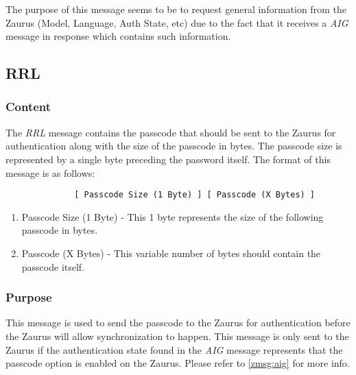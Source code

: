             The purpose of this message seems to be to request general
            information from the Zaurus (Model, Language, Auth State, etc) due
            to the fact that it receives a \emph{AIG} message in response
            which contains such information.

        \subsection{RRL}

            \subsubsection{Content}

            The \emph{RRL} message contains the passcode that should be sent
            to the Zaurus for authentication along with the size of the
            passcode in bytes. The passcode size is represented by a single
            byte preceding the password itself. The format of this message is
            as follows:

            \begin{verbatim}
              [ Passcode Size (1 Byte) ] [ Passcode (X Bytes) ]
            \end{verbatim}

            \begin{enumerate}
            \item Passcode Size (1 Byte) - This 1 byte represents the size of
              the following passcode in bytes.

            \item Passcode (X Bytes) - This variable number of bytes should
              contain the passcode itself.
            \end{enumerate}
            
            \subsubsection{Purpose}

            This message is used to send the passcode to the Zaurus for
            authentication before the Zaurus will allow synchronization to
            happen. This message is only sent to the Zaurus if the
            authentication state found in the \emph{AIG} message represents
            that the passcode option is enabled on the Zaurus. Please refer to
            \ref{zmsg:aig} for more info.

